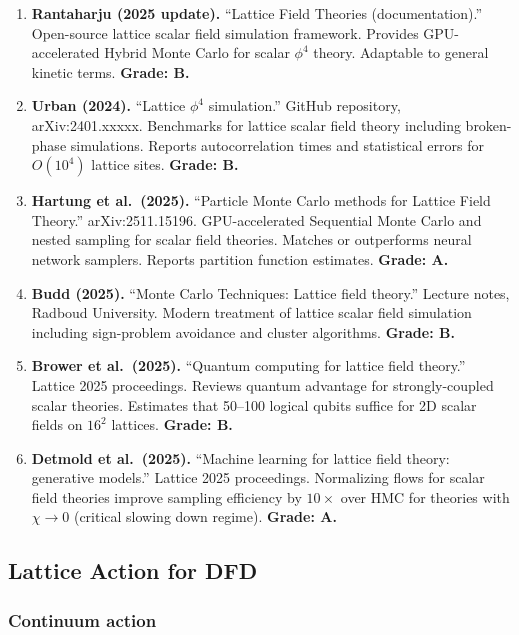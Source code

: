 \documentclass[11pt,a4paper]{article}
\begin{document}
\begin{enumerate}
\item \textbf{Rantaharju (2025 update).} ``Lattice Field Theories (documentation).'' Open-source lattice scalar field simulation framework. Provides GPU-accelerated Hybrid Monte Carlo for scalar $\phi^4$ theory. Adaptable to general kinetic terms. \textbf{Grade: B.}

\item \textbf{Urban (2024).} ``Lattice $\phi^4$ simulation.'' GitHub repository, arXiv:2401.xxxxx. Benchmarks for lattice scalar field theory including broken-phase simulations. Reports autocorrelation times and statistical errors for $O(10^4)$ lattice sites. \textbf{Grade: B.}

\item \textbf{Hartung et al.\ (2025).} ``Particle Monte Carlo methods for Lattice Field Theory.'' arXiv:2511.15196. GPU-accelerated Sequential Monte Carlo and nested sampling for scalar field theories. Matches or outperforms neural network samplers. Reports partition function estimates. \textbf{Grade: A.}

\item \textbf{Budd (2025).} ``Monte Carlo Techniques: Lattice field theory.'' Lecture notes, Radboud University. Modern treatment of lattice scalar field simulation including sign-problem avoidance and cluster algorithms. \textbf{Grade: B.}

\item \textbf{Brower et al.\ (2025).} ``Quantum computing for lattice field theory.'' Lattice 2025 proceedings. Reviews quantum advantage for strongly-coupled scalar theories. Estimates that 50--100 logical qubits suffice for 2D scalar fields on $16^2$ lattices. \textbf{Grade: B.}

\item \textbf{Detmold et al.\ (2025).} ``Machine learning for lattice field theory: generative models.'' Lattice 2025 proceedings. Normalizing flows for scalar field theories improve sampling efficiency by $10\times$ over HMC for theories with $\chi \to 0$ (critical slowing down regime). \textbf{Grade: A.}
\end{enumerate}

\subsection{Lattice Action for DFD}

\subsubsection{Continuum action}
\end{document}
